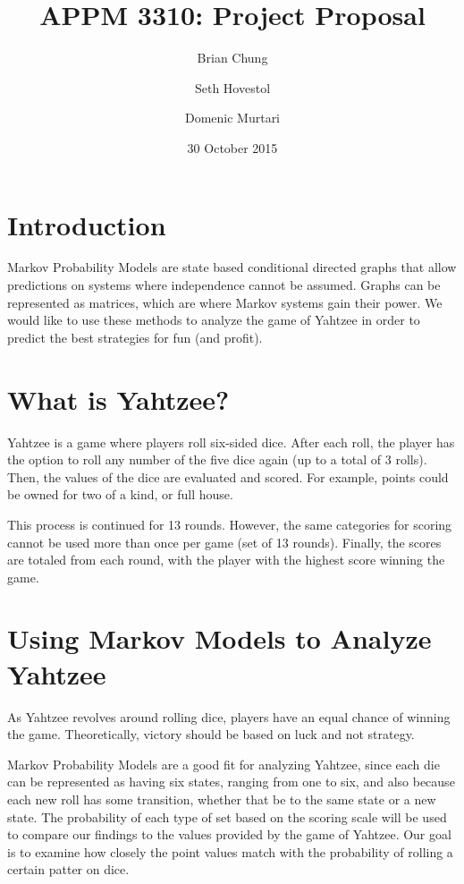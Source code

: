 \documentclass[12pt, letterpaper, twoside]{article}
\title{APPM 3310: Project Proposal}
\author{Brian Chung}
\author{Seth Hovestol}
\author{Domenic Murtari}
\date{30 October 2015}
\begin{document}
 
\maketitle

\section{Introduction}

Markov Probability Models are state based conditional directed graphs that
allow predictions on systems where independence cannot be assumed. Graphs can
be represented as matrices, which are where Markov systems gain their power.
We would like to use these methods to analyze the game of Yahtzee in order to
predict the best strategies for fun (and profit).

\section{What is Yahtzee?}

Yahtzee is a game where players roll six-sided dice. After each roll, the
player has the option to roll any number of the five dice again (up to a total
of 3 rolls). Then, the values of the dice are evaluated and scored. For example,
points could be owned for two of a kind, or full house.

This process is continued for 13 rounds. However, the same categories for scoring
cannot be used more than once per game (set of 13 rounds). Finally, the scores
are totaled from each round, with the player with the highest score winning the
game.

\section{Using Markov Models to Analyze Yahtzee}

As Yahtzee revolves around rolling dice, players have an equal chance of
winning the game. Theoretically, victory should be based on luck and not
strategy.

Markov Probability Models are a good fit for analyzing Yahtzee, since each
die can be represented as having six states, ranging from one to six, and also
because each new roll has some transition, whether that be to the same state or
a new state. The probability of each type of set based on the scoring scale will
be used to compare our findings to the values provided by the game of Yahtzee.
Our goal is to examine how closely the point values match with the probability
of rolling a certain patter on dice.
\end{document}
